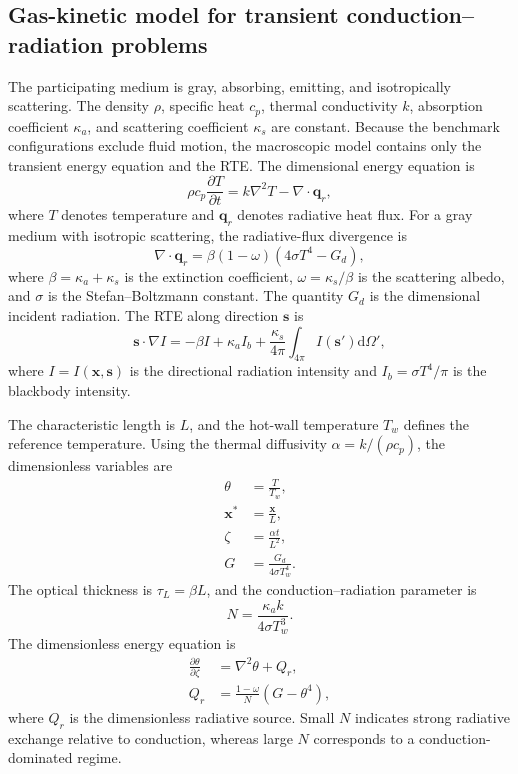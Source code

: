 \documentclass[a4paper,12pt]{ctexart}
\numberwithin{equation}{section}
\newcommand{\vb}[1]{\bm{#1}}
\newcommand{\vx}{\vb{x}}
\newcommand{\vs}{\vb{s}}
\newcommand{\vq}{\vb{q}}
\newcommand{\dd}{\mathrm{d}}
\begin{document}
\subsection{Gas-kinetic model for transient conduction--radiation problems}
\label{subsec:kinetic_model}

The participating medium is gray, absorbing, emitting, and isotropically scattering. The density $\rho$, specific heat $c_p$, thermal conductivity $k$, absorption coefficient $\kappa_a$, and scattering coefficient $\kappa_s$ are constant. Because the benchmark configurations exclude fluid motion, the macroscopic model contains only the transient energy equation and the RTE. The dimensional energy equation is
\begin{equation*}
\rho c_p\frac{\partial T}{\partial t}=k\nabla^2T-\nabla\cdot\vq_r,
\end{equation*}
where $T$ denotes temperature and $\vq_r$ denotes radiative heat flux. For a gray medium with isotropic scattering, the radiative-flux divergence is
\begin{equation*}
\nabla\cdot\vq_r=\beta(1-\omega)\left(4\sigma T^4-G_d\right),
\end{equation*}
where $\beta=\kappa_a+\kappa_s$ is the extinction coefficient, $\omega=\kappa_s/\beta$ is the scattering albedo, and $\sigma$ is the Stefan--Boltzmann constant. The quantity $G_d$ is the dimensional incident radiation. The RTE along direction $\vs$ is
\begin{equation*}
\vs\cdot\nabla I=-\beta I+\kappa_a I_b+\frac{\kappa_s}{4\pi}\int_{4\pi}I(\vs')\dd\Omega',
\end{equation*}
where $I=I(\vx,\vs)$ is the directional radiation intensity and $I_b=\sigma T^4/\pi$ is the blackbody intensity.

The characteristic length is $L$, and the hot-wall temperature $T_w$ defines the reference temperature. Using the thermal diffusivity $\alpha=k/(\rho c_p)$, the dimensionless variables are
\begin{equation*}
\begin{aligned}
\theta&=\frac{T}{T_w},\\
\vx^*&=\frac{\vx}{L},\\
\zeta&=\frac{\alpha t}{L^2},\\
G&=\frac{G_d}{4\sigma T_w^4}.
\end{aligned}
\end{equation*}
The optical thickness is $\tau_L=\beta L$, and the conduction--radiation parameter is
\begin{equation*}
N=\frac{\kappa_a k}{4\sigma T_w^3}.
\end{equation*}
The dimensionless energy equation is
\begin{equation}
\begin{aligned}
\frac{\partial\theta}{\partial\zeta}&=\nabla^2\theta+Q_r,
\\
Q_r&=\frac{1-\omega}{N}\left(G-\theta^4\right),
\end{aligned}
\label{eq:dimensionless_energy}
\end{equation}
where $Q_r$ is the dimensionless radiative source. Small $N$ indicates strong radiative exchange relative to conduction, whereas large $N$ corresponds to a conduction-dominated regime.
\end{document}
